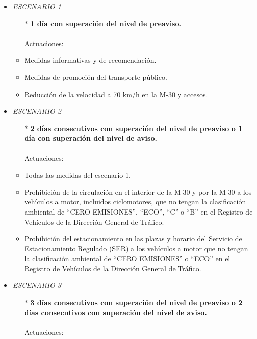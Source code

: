 \begin{itemize}
	\item \textit{ESCENARIO 1}
		\begin{itemize}
			\item[$\ast$] \textbf{1 día con superación del nivel de preaviso. }
			\\ \\
			Actuaciones:
		\end{itemize}
		\begin{itemize}
				\item Medidas informativas y de recomendación.
				\item Medidas de promoción del transporte público.
				\item Reducción de la velocidad a 70 km/h en la M-30 y accesos.
		\end{itemize}
	\item \textit{ESCENARIO 2}
		\begin{itemize}
			\item[$\ast$] \textbf{2 días consecutivos con superación del nivel de preaviso o 1 día con superación del nivel de aviso. }
			\\ \\
			Actuaciones:
		\end{itemize}
		\begin{itemize}
			\item Todas las medidas del escenario 1.
			\item Prohibición de la circulación en el interior de la M-30 y por la M-30 a los vehículos a motor, incluidos ciclomotores, que no tengan la clasificación ambiental de “CERO EMISIONES”, “ECO”, “C” o “B” en el Registro de Vehículos de la Dirección General de Tráfico. 
			\item Prohibición del estacionamiento en las plazas y horario del Servicio de Estacionamiento Regulado (SER) a los vehículos a motor que no tengan la clasificación ambiental de “CERO EMISIONES” o “ECO” en el Registro de Vehículos de la Dirección General de Tráfico. 
		\end{itemize}
	\item \textit{ESCENARIO 3}
		\begin{itemize}
			\item[$\ast$] \textbf{3 días consecutivos con superación del nivel de preaviso o 2 días consecutivos con superación del nivel de aviso. }
			\\ \\
			Actuaciones:
		\end{itemize}

\end{itemize}

